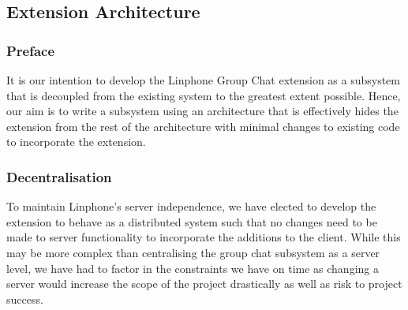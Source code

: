 \documentclass[11pt]{article}
\begin{document}
\subsection{Extension Architecture}
\subsubsection{Preface}
It is our intention to develop the Linphone Group Chat extension as a subsystem that is decoupled from the existing system to the greatest extent possible. Hence, our aim is to write a subsystem using an architecture that is effectively hides the extension from the rest of the architecture with minimal changes to existing code to incorporate the extension.

\subsubsection{Decentralisation}
To maintain Linphone's server independence, we have elected to develop the extension to behave as a distributed system such that no changes need to be made to server functionality to incorporate the additions to the client. While this may be more complex than centralising the group chat subsystem as a server level, we have had to factor in the constraints we have on time as changing a server would increase the scope of the project drastically as well as risk to project success.
\end{document}
